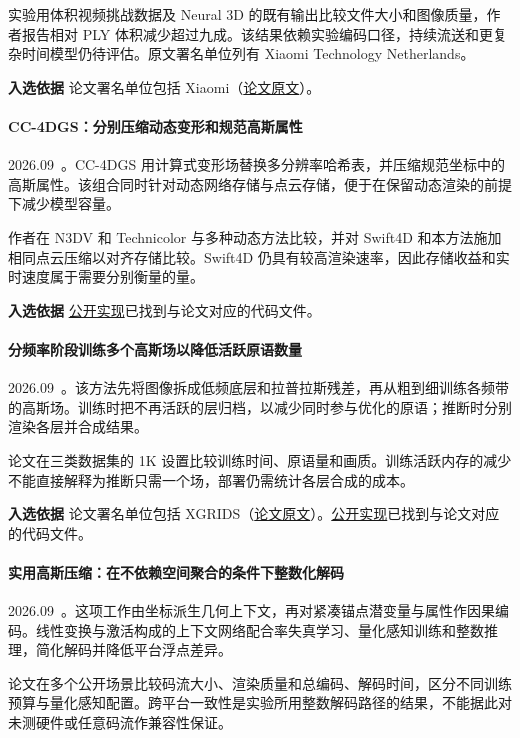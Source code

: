 实验用体积视频挑战数据及 Neural 3D 的既有输出比较文件大小和图像质量，作者报告相对 PLY 体积减少超过九成。该结果依赖实验编码口径，持续流送和更复杂时间模型仍待评估。原文署名单位列有 Xiaomi Technology Netherlands。

\textbf{入选依据} 论文署名单位包括 Xiaomi（\href{https://arxiv.org/html/2607.28049v1}{论文原文}）。

\paragraph{CC-4DGS：分别压缩动态变形和规范高斯属性}
2026.09~\cite{2609_02184}。CC-4DGS 用计算式变形场替换多分辨率哈希表，并压缩规范坐标中的高斯属性。该组合同时针对动态网络存储与点云存储，便于在保留动态渲染的前提下减少模型容量。

作者在 N3DV 和 Technicolor 与多种动态方法比较，并对 Swift4D 和本方法施加相同点云压缩以对齐存储比较。Swift4D 仍具有较高渲染速率，因此存储收益和实时速度属于需要分别衡量的量。

\textbf{入选依据} \href{https://github.com/kyungdaepark/cc-4dgs}{公开实现}已找到与论文对应的代码文件。

\paragraph{分频率阶段训练多个高斯场以降低活跃原语数量}
2026.09~\cite{2609_03334}。该方法先将图像拆成低频底层和拉普拉斯残差，再从粗到细训练各频带的高斯场。训练时把不再活跃的层归档，以减少同时参与优化的原语；推断时分别渲染各层并合成结果。

论文在三类数据集的 1K 设置比较训练时间、原语量和画质。训练活跃内存的减少不能直接解释为推断只需一个场，部署仍需统计各层合成的成本。

\textbf{入选依据} 论文署名单位包括 XGRIDS（\href{https://arxiv.org/abs/2609.03334}{论文原文}）。\href{https://github.com/sorenzhang574/laplacian-gs}{公开实现}已找到与论文对应的代码文件。

\paragraph{实用高斯压缩：在不依赖空间聚合的条件下整数化解码}
2026.09~\cite{2609_30245}。这项工作由坐标派生几何上下文，再对紧凑锚点潜变量与属性作因果编码。线性变换与激活构成的上下文网络配合率失真学习、量化感知训练和整数推理，简化解码并降低平台浮点差异。

论文在多个公开场景比较码流大小、渲染质量和总编码、解码时间，区分不同训练预算与量化感知配置。跨平台一致性是实验所用整数解码路径的结果，不能据此对未测硬件或任意码流作兼容性保证。

